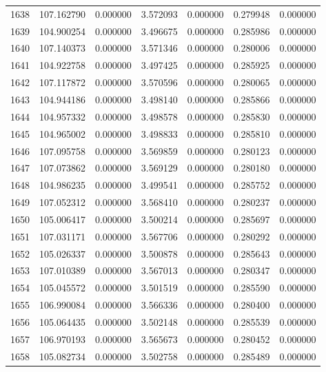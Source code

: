\begin{tabular}{rrrrrrr}
1638 & 107.162790 &    0.000000 &  3.572093 &   0.000000 &   0.279948 &  0.000000 \\
1639 & 104.900254 &    0.000000 &  3.496675 &   0.000000 &   0.285986 &  0.000000 \\
1640 & 107.140373 &    0.000000 &  3.571346 &   0.000000 &   0.280006 &  0.000000 \\
1641 & 104.922758 &    0.000000 &  3.497425 &   0.000000 &   0.285925 &  0.000000 \\
1642 & 107.117872 &    0.000000 &  3.570596 &   0.000000 &   0.280065 &  0.000000 \\
1643 & 104.944186 &    0.000000 &  3.498140 &   0.000000 &   0.285866 &  0.000000 \\
1644 & 104.957332 &    0.000000 &  3.498578 &   0.000000 &   0.285830 &  0.000000 \\
1645 & 104.965002 &    0.000000 &  3.498833 &   0.000000 &   0.285810 &  0.000000 \\
1646 & 107.095758 &    0.000000 &  3.569859 &   0.000000 &   0.280123 &  0.000000 \\
1647 & 107.073862 &    0.000000 &  3.569129 &   0.000000 &   0.280180 &  0.000000 \\
1648 & 104.986235 &    0.000000 &  3.499541 &   0.000000 &   0.285752 &  0.000000 \\
1649 & 107.052312 &    0.000000 &  3.568410 &   0.000000 &   0.280237 &  0.000000 \\
1650 & 105.006417 &    0.000000 &  3.500214 &   0.000000 &   0.285697 &  0.000000 \\
1651 & 107.031171 &    0.000000 &  3.567706 &   0.000000 &   0.280292 &  0.000000 \\
1652 & 105.026337 &    0.000000 &  3.500878 &   0.000000 &   0.285643 &  0.000000 \\
1653 & 107.010389 &    0.000000 &  3.567013 &   0.000000 &   0.280347 &  0.000000 \\
1654 & 105.045572 &    0.000000 &  3.501519 &   0.000000 &   0.285590 &  0.000000 \\
1655 & 106.990084 &    0.000000 &  3.566336 &   0.000000 &   0.280400 &  0.000000 \\
1656 & 105.064435 &    0.000000 &  3.502148 &   0.000000 &   0.285539 &  0.000000 \\
1657 & 106.970193 &    0.000000 &  3.565673 &   0.000000 &   0.280452 &  0.000000 \\
1658 & 105.082734 &    0.000000 &  3.502758 &   0.000000 &   0.285489 &  0.000000 \\

\end{tabular}
